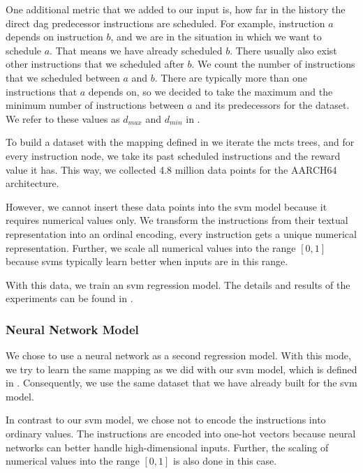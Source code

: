 One 
additional metric that we added to our input is, how far in the history the direct \ac{dag} predecessor instructions are scheduled.
For example, instruction $a$ depends on instruction $b$, and we are in the situation in which we want to schedule $a$.
That means we have already scheduled $b$.
There usually also exist other instructions that we scheduled after $b$.
We count the number of instructions that we scheduled between $a$ and $b$.
There are typically more than one instructions that $a$ depends on, so we decided to take the maximum and the minimum number of instructions between $a$ and its predecessors for the dataset.
We refer to these values as $d_{max}$ and $d_{min}$ in .

To build a dataset with the mapping defined in  we iterate the \ac{mcts} trees, and for every instruction node, we take its past scheduled instructions and the reward value it has.
This way, we collected 4.8 million data points for the AARCH64 architecture.

However, we cannot insert these data points into the \ac{svm} model because it requires numerical values only.
We transform the instructions from their textual representation into an ordinal encoding, \ie every instruction gets a unique numerical representation.
Further, we scale all numerical values into the range $[0,1]$ because \acp{svm} typically learn better when inputs are in this range.

With this data, we train an \ac{svm} regression model.
The details and results of the experiments can be found in .

\subsubsection{Neural Network Model}
We chose to use a neural network as a second regression model.
With this mode, we try to learn the same mapping as we did with our \ac{svm} model, which is defined in .
Consequently, we use the same dataset that we have already built for the \ac{svm} model.

In contrast to our \ac{svm} model, we chose not to encode the instructions into ordinary values.
The instructions are encoded into one-hot vectors because neural networks can better handle high-dimensional inputs.
Further, the scaling of numerical values into the range $[0,1]$ is also done in this case.

